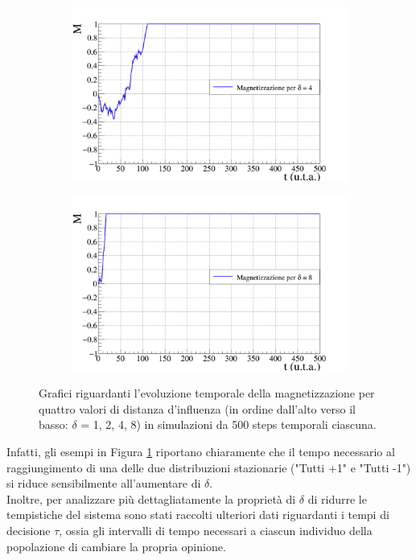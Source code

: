 \documentclass[letterpaper,10pt]{article}
\begin{document}
\begin{figure}
\ContinuedFloat
\centering
\begin{subfigure}{0.8\textwidth}
\includegraphics[width=\linewidth]{Immagini/magn_graph_d4.png}
\end{subfigure}
\begin{subfigure}{0.8\textwidth}
\includegraphics[width=\linewidth]{Immagini/magn_graph_d8.png}
\end{subfigure}
\caption{Grafici riguardanti l'evoluzione temporale della magnetizzazione per quattro valori di distanza d'influenza (in ordine dall'alto verso il basso: $\delta$ = 1, 2, 4, 8) in simulazioni da 500 steps temporali ciascuna.}
\label{Fig:9}
\end{figure}

Infatti, gli esempi in Figura \ref{Fig:9} riportano chiaramente che il tempo necessario al raggiungimento di una delle due distribuzioni stazionarie ("Tutti +1" e "Tutti -1") si riduce sensibilmente all'aumentare di $\delta$.
\\ Inoltre, per analizzare più dettagliatamente la proprietà di $\delta$ di ridurre le tempistiche del sistema sono stati raccolti ulteriori dati riguardanti i tempi di decisione $\tau$, ossia gli intervalli di tempo necessari a ciascun individuo della popolazione di cambiare la propria opinione.
\end{document}
